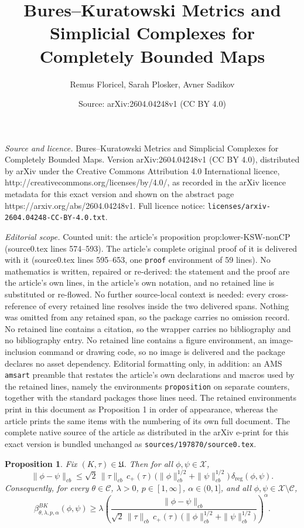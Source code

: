 \documentclass[10pt,a4paper]{amsart}
\title{Bures--Kuratowski Metrics and Simplicial Complexes for Completely Bounded Maps}
\author{Remus Floricel, Sarah Plosker, Avner Sadikov}
\date{Source: arXiv:2604.04248v1 (CC BY 4.0)}
\newtheorem{proposition}{Proposition}
\begin{document}
\maketitle

\noindent\emph{Source and licence.} Bures--Kuratowski Metrics and Simplicial Complexes for Completely Bounded Maps. Version arXiv:2604.04248v1 (CC BY 4.0), distributed by arXiv under the Creative Commons Attribution 4.0 International licence, http://creativecommons.org/licenses/by/4.0/, as recorded in the arXiv licence metadata for this exact version and shown on the abstract page https://arxiv.org/abs/2604.04248v1. Full licence notice: \texttt{licenses/arxiv-2604.04248-CC-BY-4.0.txt}.\par\smallskip

\noindent\textit{Editorial scope.} Counted unit: the article's proposition prop:lower-KSW-nonCP (source0.tex lines 574--593). The article's complete original proof of it is delivered with it (source0.tex lines 595--653, one \texttt{proof} environment of 59 lines). No mathematics is written, repaired or re-derived: the statement and the proof are the article's own lines, in the article's own notation, and no retained line is substituted or re-flowed.  No further source-local context is needed: every cross-reference of every retained line resolves inside the two delivered spans.  Nothing was omitted from any retained span, so the package carries no omission record.  No retained line contains a citation, so the wrapper carries no bibliography and no bibliography entry.  No retained line contains a figure environment, an image-inclusion command or drawing code, so no image is delivered and the package declares no asset dependency.  Editorial formatting only, in addition: an AMS \texttt{amsart} preamble that restates the article's own declarations and macros used by the retained lines, namely the environments \texttt{proposition} on separate counters, together with the standard packages those lines need.  The retained environments print in this document as Proposition 1 in order of appearance, whereas the article prints the same items with the numbering of its own full document.  The complete native source of the article as distributed in the arXiv e-print for this exact version is bundled unchanged as \texttt{sources/197870/source0.tex}.
\begin{proposition}
\label{prop:lower-KSW-nonCP}
Fix $(K,\tau)\in\mathfrak U$.
Then for all $\phi,\psi\in \mathcal X$,
\[
\|\phi-\psi\|_{cb}
\le
\sqrt2\,\|\tau\|_{cb}\, c_+(\tau)\,\bigl(\|\phi\|_{cb}^{1/2}+\|\psi\|_{cb}^{1/2}\bigr)\,\delta_{\mathrm{reg}}(\phi,\psi).
\]
Consequently, for every $\theta\in \mathcal C$, $\lambda>0$, $p\in[1,\infty]$, $\alpha\in(0,1]$, and all
$\phi,\psi\in\mathcal X\setminus \mathcal C$,
\[
\beta^{BK}_{\theta,\lambda,p,\alpha}(\phi,\psi)
\ge
\lambda\left(
\frac{\|\phi-\psi\|_{cb}}
{\sqrt2\,\|\tau\|_{cb}\, c_+(\tau)\,\bigl(\|\phi\|_{cb}^{1/2}+\|\psi\|_{cb}^{1/2}\bigr)}
\right)^\alpha.
\]
\end{proposition}
\end{document}
